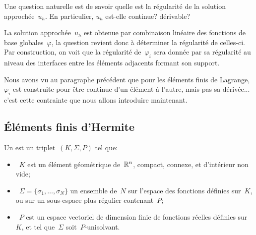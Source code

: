 Une question naturelle est de savoir quelle est la régularité de la solution approchée~$u_h$. En particulier, $u_h$ est-elle continue? dérivable?

La solution approchée~$u_h$ est obtenue par combinaison linéaire des fonctions de base globales~$\varphi$, la question revient donc à déterminer la régularité de celles-ci. Par construction, on voit que la régularité de~$\varphi_i$ sera donnée par sa régularité au niveau des interfaces entre les éléments adjacents formant son support.

Nous avons vu au paragraphe précédent que pour les éléments finis de Lagrange, $\varphi_i$ est construite pour être continue d'un élément à l'autre, mais pas sa dérivée... c'est cette contrainte que nous allons introduire maintenant.


\medskip
\subsection{Éléments finis d'Hermite}

\begin{definition}
Un  est un triplet~$(K, \Sigma, P)$ tel que:
\begin{itemize}
\item~$K$ est un élément géométrique de~$\mathbb R^n$, compact, connexe, et d'intérieur non vide;
\item~$\Sigma=\{\sigma_1,\ldots, \sigma_N\}$ un ensemble de~$N$  sur l'espace des fonctions définies sur~$K$, ou sur un sous-espace plus régulier contenant~$P$;
\item~$P$ est un espace vectoriel de dimension finie de fonctions réelles définies sur~$K$, et tel que~$\Sigma$ soit~$P$-unisolvant.
\end{itemize}
\end{definition}

